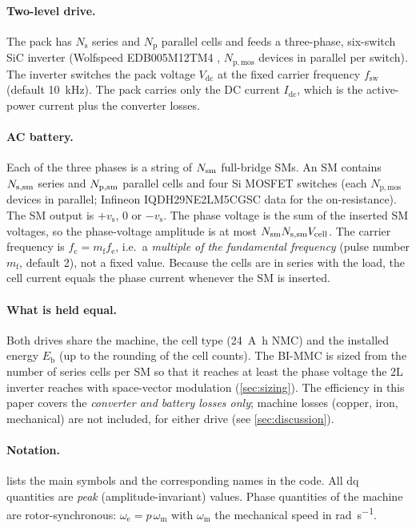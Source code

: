 \paragraph{Two-level drive.} The pack has $N_\mathrm{s}$ series and $N_\mathrm{p}$ parallel cells and feeds a three-phase, six-switch SiC inverter (Wolfspeed EDB005M12TM4 \cite{wolfspeed_edb005}, $N_\mathrm{p,mos}$ devices in parallel per switch). The inverter switches the pack voltage $V_\mathrm{dc}$ at the fixed carrier frequency $f_\mathrm{sw}$ (default \SI{10}{\kilo\hertz}). The pack carries only the DC current $I_\mathrm{dc}$, which is the active-power current plus the converter losses.

\paragraph{AC battery.} Each of the three phases is a string of $N_\mathrm{sm}$ full-bridge SMs. An SM contains $N_\mathrm{s,sm}$ series and $N_\mathrm{p,sm}$ parallel cells and four Si MOSFET switches (each $N_\mathrm{p,mos}$ devices in parallel; Infineon IQDH29NE2LM5CGSC data for the on-resistance). The SM output is $+v_\mathrm{s}$, $0$ or $-v_\mathrm{s}$. The phase voltage is the sum of the inserted SM voltages, so the phase-voltage amplitude is at most $N_\mathrm{sm}N_\mathrm{s,sm} V_\mathrm{cell}$. The carrier frequency is $f_\mathrm{c}=m_\mathrm{f}f_\mathrm{e}$, i.e.\ a \emph{multiple of the fundamental frequency} (pulse number $m_\mathrm{f}$, default 2), not a fixed value. Because the cells are in series with the load, the cell current equals the phase current whenever the SM is inserted.

\paragraph{What is held equal.} Both drives share the machine, the cell type (\SI{24}{\ampere\hour} NMC) and the installed energy $E_\mathrm{b}$ (up to the rounding of the cell counts). The BI-MMC is sized from the number of series cells per SM so that it reaches at least the phase voltage the 2L inverter reaches with space-vector modulation (\cref{sec:sizing}). The efficiency in this paper covers the \emph{converter and battery losses only}; machine losses (copper, iron, mechanical) are not included, for either drive (see \cref{sec:discussion}).

\paragraph{Notation.}  lists the main symbols and the corresponding names in the code. All dq quantities are \emph{peak} (amplitude-invariant) values. Phase quantities of the machine are rotor-synchronous: $\omega_\mathrm{e}=p\,\omega_\mathrm{m}$ with $\omega_\mathrm{m}$ the mechanical speed in \si{\radian\per\second}.

